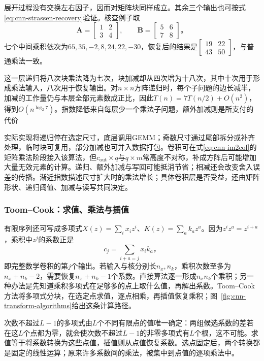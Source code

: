 展开过程没有交换左右因子，因而对矩阵块同样成立。其余三个输出也可按式\eqref{eq:cnn-strassen-recovery}验证。核查例子取
\[
  \bm A=\begin{bmatrix}1&2\\3&4\end{bmatrix},\qquad
  \bm B=\begin{bmatrix}5&6\\7&8\end{bmatrix}\text{。}
\]
七个中间乘积依次为$65,35,-2,8,24,22,-30$，恢复后的结果是$\left[\begin{smallmatrix}19&22\\43&50\end{smallmatrix}\right]$，与普通乘法一致。

这一层递归将八次块乘法降为七次，块加减却从四次增为十八次，其中十次用于形成乘法输入，八次用于恢复输出。对$n\times n$方阵递归时，每个子问题的边长减半，加减的工作量仍与本层全部元素数成正比，因此$T(n)=7T(n/2)+O(n^2)$，得到$O(n^{\log_2 7})$。指数降低来自每层少一个乘法子问题，额外加减则是所支付的代价

实际实现将递归停在选定尺寸，底层调用GEMM；奇数尺寸通过尾部拆分或补齐处理，临时块可复用，部分加减也可并入数据打包。卷积可在式\eqref{eq:cnn-im2col}的矩阵乘法阶段接入该算法，但$c_{\mathrm{out}}\times q$与$q\times m$常高度不对称，补成方阵后可能增加大量无效元素的计算。递归、额外加减与写回可能抵消节省；相减还会改变舍入误差的传播。渐近指数描述尺寸扩大时的乘法增长；具体卷积层是否受益，还由矩阵形状、递归阈值、加减与读写共同决定。

\subsubsection{Toom--Cook：求值、乘法与插值}
\label{sec:cnn-toom-cook}

有限序列还可写成多项式$X(z)=\sum_i x_i z^i$、$K(z)=\sum_a k_a z^a$。因为$z^i z^a=z^{i+a}$，乘积中$z^j$的系数正是
\[
  c_j=\sum_{i+a=j}x_i k_a\text{，}
\]
即完整数学卷积的第$j$个输出。若输入与核分别长$n_x,n_k$，乘积次数至多为$n_x+n_k-2$，需要恢复$n_x+n_k-1$个系数。直接算法逐一形成$n_xn_k$个乘积；另一种办法是先知道乘积多项式在足够多的点上取什么值，再解出系数。Toom--Cook方法将多项式分块，在选定点求值，逐点相乘，再插值恢复乘积；图~\ref{fig:cnn-transform-algorithms}给出这条计算路径。

次数不超过$L-1$的多项式由$L$个不同有限点的值唯一确定：两组候选系数的差若在这$L$个点都为零，就会使次数不超过$L-1$的非零多项式有$L$个根，这不可能。求值等于将系数转换为这些点值，插值则从点值恢复系数。选点固定后，两个转换都是固定的线性运算；原来许多系数间的乘法，被集中到点值的逐项乘法中。

